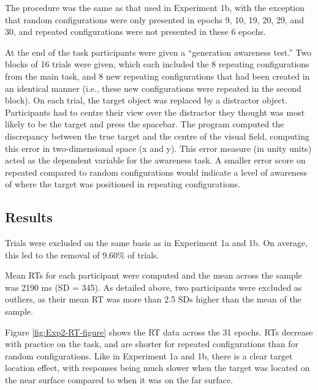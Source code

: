 \documentclass[
  english,
  man,floatsintext]{apa7}
\begin{document}
The procedure was the same as that used in Experiment 1b, with the exception that random configurations were only presented in epochs 9, 10, 19, 20, 29, and 30, and repeated configurations were not presented in these 6 epochs.

At the end of the task participants were given a ``generation awareness test.'' Two blocks of 16 trials were given, which each included the 8 repeating configurations from the main task, and 8 new repeating configurations that had been created in an identical manner (i.e., these new configurations were repeated in the second block). On each trial, the target object was replaced by a distractor object. Participants had to centre their view over the distractor they thought was most likely to be the target and press the spacebar. The program computed the discrepancy between the true target and the centre of the visual field, computing this error in two-dimensional space (x and y). This error measure (in unity units) acted as the dependent variable for the awareness task. A smaller error score on repeated compared to random configurations would indicate a level of awareness of where the target was positioned in repeating configurations.

\hypertarget{results-1}{%
\subsection{Results}\label{results-1}}

Trials were excluded on the same basis as in Experiment 1a and 1b. On average, this led to the removal of 9.60\% of trials.

Mean RTs for each participant were computed and the mean across the sample was 2190 ms (SD = 345). As detailed above, two participants were excluded as outliers, as their mean RT was more than 2.5 SDs higher than the mean of the sample.

Figure \ref{fig:Exp2-RT-figure} shows the RT data across the 31 epochs. RTs decrease with practice on the task, and are shorter for repeated configurations than for random configurations. Like in Experiment 1a and 1b, there is a clear target location effect, with responses being much slower when the target was located on the near surface compared to when it was on the far surface.
\end{document}
